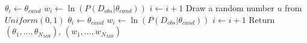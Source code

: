 \begin{algorithm}[H]
\begin{algorithmic}[1]
            \EndIf
            \EndWhile
            \State $\theta_i \leftarrow \theta_{cand}$
            \State $w_i \leftarrow \ln(P(D_{obs}|\theta_{cand}))$
            \State $i \leftarrow i + 1$
            \Else
            \State Draw a random number $u$ from $Uniform(0,1)$
            \State $\theta_i \leftarrow \theta_{cand}$
            \State $w_i \leftarrow \ln(P(D_{obs}|\theta_{cand}))$
            \State $i \leftarrow i + 1$
            \EndIf
            \EndIf
            \EndWhile
            \State Return $(\theta_1,\ldots,\theta_{N_{MH}})$, $(w_1,\ldots,w_{N_{MH}})$
            \EndProcedure
      \end{algorithmic}
\end{algorithm}

